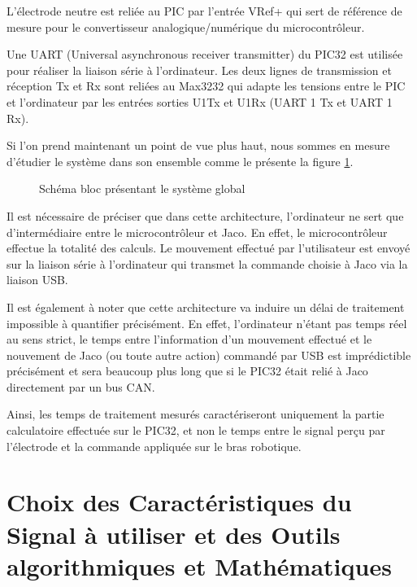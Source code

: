\documentclass[letterpaper, twoside, 12pt, memoire, creativecommons, hyperref]{thETS}
\begin{document}
L'électrode neutre est reliée au PIC par l'entrée VRef+ qui sert de référence de mesure pour le convertisseur analogique/numérique du microcontrôleur. 

Une UART (Universal asynchronous receiver transmitter) du PIC32 est utilisée pour réaliser la liaison série à l'ordinateur. Les deux lignes de transmission et réception Tx et Rx sont reliées au Max3232 qui adapte les tensions entre le PIC et l'ordinateur par les entrées sorties U1Tx et U1Rx (UART 1 Tx et UART 1 Rx).

Si l'on prend maintenant un point de vue plus haut, nous sommes en mesure d'étudier le système dans son ensemble comme le présente la figure \ref{fig:archiMatTot}.

\begin{figure}
	\centering
	\caption{Schéma bloc présentant le système global}
	\label{fig:archiMatTot}
\end{figure}

Il est nécessaire de préciser que dans cette architecture, l'ordinateur ne sert que d'intermédiaire entre le microcontrôleur et Jaco. En effet, le microcontrôleur effectue la totalité des calculs. Le mouvement effectué par l'utilisateur est envoyé sur la liaison série à l'ordinateur qui transmet la commande choisie à Jaco via la liaison USB. 

Il est également à noter que cette architecture va induire un délai de traitement impossible à quantifier précisément. En effet, l'ordinateur n'étant pas temps réel au sens strict, le temps entre l'information d'un mouvement effectué et le nouvement de Jaco (ou toute autre action) commandé par USB est imprédictible précisément et sera beaucoup plus long que si le PIC32 était relié à Jaco directement par un bus CAN. 

Ainsi, les temps de traitement mesurés caractériseront uniquement la partie calculatoire effectuée sur le PIC32, et non le temps entre le signal perçu par l'électrode et la commande appliquée sur le bras robotique.

\section{Choix des Caractéristiques du Signal à utiliser et des Outils algorithmiques et Mathématiques}
\end{document}

